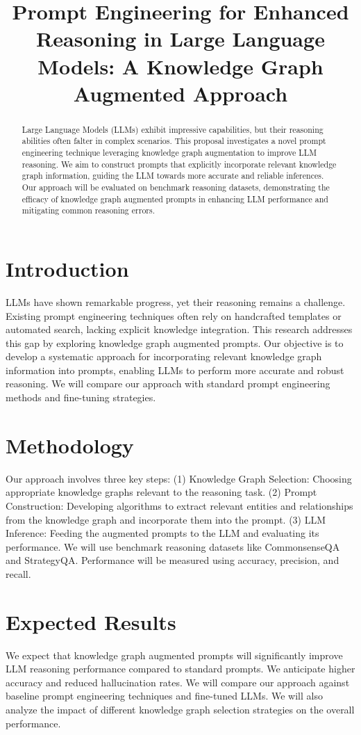 \documentclass{article}
\title{Prompt Engineering for Enhanced Reasoning in Large Language Models: A Knowledge Graph Augmented Approach}
\begin{document}
\maketitle

\begin{abstract}
Large Language Models (LLMs) exhibit impressive capabilities, but their reasoning abilities often falter in complex scenarios. This proposal investigates a novel prompt engineering technique leveraging knowledge graph augmentation to improve LLM reasoning. We aim to construct prompts that explicitly incorporate relevant knowledge graph information, guiding the LLM towards more accurate and reliable inferences. Our approach will be evaluated on benchmark reasoning datasets, demonstrating the efficacy of knowledge graph augmented prompts in enhancing LLM performance and mitigating common reasoning errors.
\end{abstract}

\section{Introduction}
LLMs have shown remarkable progress, yet their reasoning remains a challenge. Existing prompt engineering techniques often rely on handcrafted templates or automated search, lacking explicit knowledge integration. This research addresses this gap by exploring knowledge graph augmented prompts. Our objective is to develop a systematic approach for incorporating relevant knowledge graph information into prompts, enabling LLMs to perform more accurate and robust reasoning. We will compare our approach with standard prompt engineering methods and fine-tuning strategies.
\section{Methodology}
Our approach involves three key steps: (1) Knowledge Graph Selection: Choosing appropriate knowledge graphs relevant to the reasoning task. (2) Prompt Construction: Developing algorithms to extract relevant entities and relationships from the knowledge graph and incorporate them into the prompt. (3) LLM Inference: Feeding the augmented prompts to the LLM and evaluating its performance. We will use benchmark reasoning datasets like CommonsenseQA and StrategyQA. Performance will be measured using accuracy, precision, and recall.
\section{Expected Results}
We expect that knowledge graph augmented prompts will significantly improve LLM reasoning performance compared to standard prompts. We anticipate higher accuracy and reduced hallucination rates. We will compare our approach against baseline prompt engineering techniques and fine-tuned LLMs. We will also analyze the impact of different knowledge graph selection strategies on the overall performance.
\end{document}
